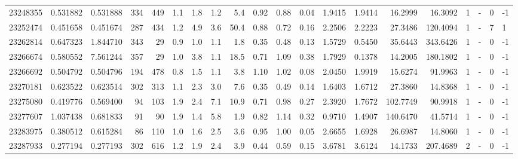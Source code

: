 \begin{tabular}{rrrrrrrrrrrrrrrrrlrl}
  23248355 & 0.531882 &   0.531888 &  334 &  449 &      1.1 &      1.8 &     1.2 &      5.4 &       0.92 &        0.88 &        0.04 &  1.9415 &  1.9414 &   16.2999 &   16.3092 &       1 &             - &        0 &        -1 \\
  23252474 & 0.451658 &   0.451674 &  287 &  434 &      1.2 &      4.9 &     3.6 &     50.4 &       0.88 &        0.72 &        0.16 &  2.2506 &  2.2223 &   27.3486 &  120.4094 &       1 &             - &        7 &         1 \\
  23262814 & 0.647323 &   1.844710 &  343 &   29 &      0.9 &      1.0 &     1.1 &      1.8 &       0.35 &        0.48 &        0.13 &  1.5729 &  0.5450 &   35.6443 &  343.6426 &       1 &             - &        0 &        -1 \\
  23266674 & 0.580552 &   7.561244 &  357 &   29 &      1.0 &      3.8 &     1.1 &     18.5 &       0.71 &        1.09 &        0.38 &  1.7929 &  0.1378 &   14.2005 &  180.1802 &       1 &             - &        0 &        -1 \\
  23266692 & 0.504792 &   0.504796 &  194 &  478 &      0.8 &      1.5 &     1.1 &      3.8 &       1.10 &        1.02 &        0.08 &  2.0450 &  1.9919 &   15.6274 &   91.9963 &       1 &             - &        0 &        -1 \\
  23270181 & 0.623522 &   0.623514 &  302 &  313 &      1.1 &      2.3 &     3.0 &      7.6 &       0.35 &        0.49 &        0.14 &  1.6403 &  1.6712 &   27.3860 &   14.8368 &       1 &             - &        0 &        -1 \\
  23275080 & 0.419776 &   0.569400 &   94 &  103 &      1.9 &      2.4 &     7.1 &     10.9 &       0.71 &        0.98 &        0.27 &  2.3920 &  1.7672 &  102.7749 &   90.9918 &       1 &             - &        0 &        -1 \\
  23277607 & 1.037438 &   0.681833 &   91 &   90 &      1.9 &      1.4 &     5.8 &      1.9 &       0.82 &        1.14 &        0.32 &  0.9710 &  1.4907 &  140.6470 &   41.5714 &       1 &             - &        0 &        -1 \\
  23283975 & 0.380512 &   0.615284 &   86 &  110 &      1.0 &      1.6 &     2.5 &      3.6 &       0.95 &        1.00 &        0.05 &  2.6655 &  1.6928 &   26.6987 &   14.8060 &       1 &             - &        0 &        -1 \\
  23287933 & 0.277194 &   0.277193 &  302 &  616 &      1.2 &      1.9 &     2.4 &      3.9 &       0.44 &        0.59 &        0.15 &  3.6781 &  3.6124 &   14.1733 &  207.4689 &       2 &             - &        0 &        -1 \\

\end{tabular}
